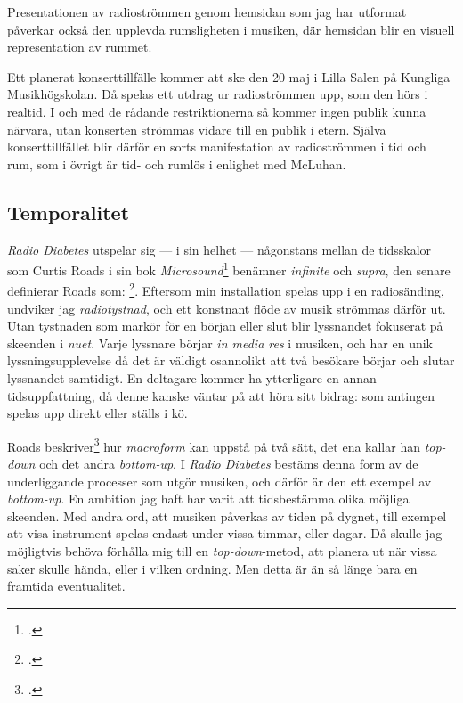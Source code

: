 \documentclass[11pt, a4paper]{article} %
\begin{document}
Presentationen av radioströmmen genom hemsidan som jag har utformat påverkar också den upplevda rumsligheten i musiken, där hemsidan blir en visuell representation av rummet. 

Ett planerat konserttillfälle kommer att ske den 20 maj i Lilla Salen på Kungliga Musikhögskolan. Då spelas ett utdrag ur radioströmmen upp, som den hörs i realtid. I och med de rådande restriktionerna så kommer ingen publik kunna närvara, utan konserten strömmas vidare till en publik i etern. Själva konserttillfället blir därför en sorts manifestation av radioströmmen i tid och rum, som i övrigt är tid- och rumlös i enlighet med McLuhan.



\subsection*{Temporalitet}
\emph{Radio Diabetes} utspelar sig --- i sin helhet --- någonstans mellan de tidsskalor som Curtis Roads i sin bok \emph{Microsound}\footcite{roads_microsound_2004} benämner \emph{infinite} och \emph{supra}, den senare definierar Roads som: \footcite[3]{roads_microsound_2004}. Eftersom min installation spelas upp i en radiosänding, undviker jag \emph{radiotystnad}, och ett konstnant flöde av musik strömmas därför ut. Utan tystnaden som markör för en början eller slut blir lyssnandet fokuserat på skeenden i \emph{nuet}. Varje lyssnare börjar \emph{in media res} i musiken, och har en unik lyssningsupplevelse då det är väldigt osannolikt att två besökare börjar och slutar lyssnandet samtidigt. En deltagare kommer ha ytterligare en annan tidsuppfattning, då denne kanske väntar på att höra sitt bidrag: som antingen spelas upp direkt eller ställs i kö.

Roads beskriver\footcite[13]{roads_microsound_2004} hur \emph{macroform} kan uppstå på två sätt, det ena kallar han \emph{top-down} och det andra \emph{bottom-up}. I \emph{Radio Diabetes} bestäms denna form av de underliggande processer som utgör musiken, och därför är den ett exempel av \emph{bottom-up}. En ambition jag haft har varit att tidsbestämma olika möjliga skeenden. Med andra ord, att musiken påverkas av tiden på dygnet, till exempel att visa instrument spelas endast under vissa timmar, eller dagar. Då skulle jag möjligtvis behöva förhålla mig till en \emph{top-down}-metod, att planera ut när vissa saker skulle hända, eller i vilken ordning. Men detta är än så länge bara en framtida eventualitet.
\end{document}
